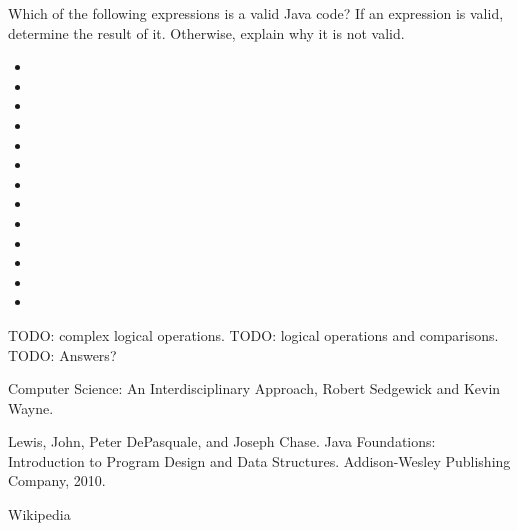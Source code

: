\begin{exercise}
Which of the following expressions is a valid Java code? If an expression is valid, determine the result of it. Otherwise, explain why it is not valid.
\begin{itemize}
\item {}
\item {}
\item {}
\item {}
\item {}
\item {}
\item {}
\item {}
\item {}
\item {}
\item {}
\item {}
\item {}
\end{itemize}
\end{exercise}

TODO: complex logical operations.
TODO: logical operations and comparisons.
TODO: Answers?

Computer Science: An Interdisciplinary Approach, Robert Sedgewick and Kevin Wayne.

Lewis, John, Peter DePasquale, and Joseph Chase. Java Foundations: Introduction to Program Design and Data Structures. Addison-Wesley Publishing Company, 2010.

Wikipedia

